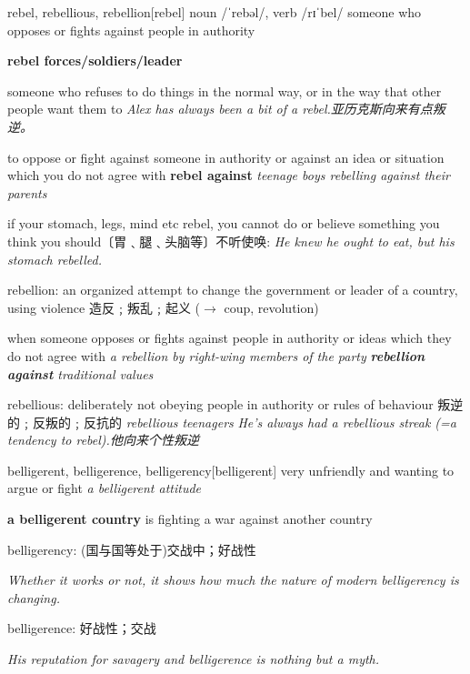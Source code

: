 \begin{DefWord}{rebel, rebellious, rebellion}[rebel]
    noun /ˈrebəl/, verb /rɪˈbel/
    someone who opposes or fights against people in authority

    \textbf{rebel forces/soldiers/leader}

    someone who refuses to do things in the normal way, or in the way that other people want them to
    \textit{Alex has always been a bit of a rebel.亚历克斯向来有点叛逆。}

    to oppose or fight against someone in authority or against an idea or situation which you do not agree with
    \textbf{rebel against}
    \textit{teenage boys rebelling against their parents}

    if your stomach, legs, mind etc rebel, you cannot do or believe something you think you should〔胃﹑腿﹑头脑等〕不听使唤:
    \textit{He knew he ought to eat, but his stomach rebelled.}

    rebellion: an organized attempt to change the government or leader of a country, using violence 造反﹔叛乱﹔起义 ($\rightarrow$ coup, revolution)

    when someone opposes or fights against people in authority or ideas which they do not agree with
    \textit{a rebellion by right-wing members of the party}
    \textit{\textbf{rebellion against} traditional values}

    rebellious: deliberately not obeying people in authority or rules of behaviour 叛逆的﹔反叛的﹔反抗的
    \textit{rebellious teenagers}
    \textit{He’s always had a rebellious streak (=a tendency to rebel).他向来个性叛逆}
\end{DefWord}

\begin{DefWord}{belligerent, belligerence, belligerency}[belligerent]
    very unfriendly and wanting to argue or fight
    \textit{a belligerent attitude}

    \textbf{a belligerent country} is fighting a war against another country

    belligerency: (国与国等处于)交战中；好战性

    \textit{Whether it works or not, it shows how much the nature of modern belligerency is changing.}
    
    belligerence: 好战性；交战

    \textit{His reputation for savagery and belligerence is nothing but a myth.}
\end{DefWord}


